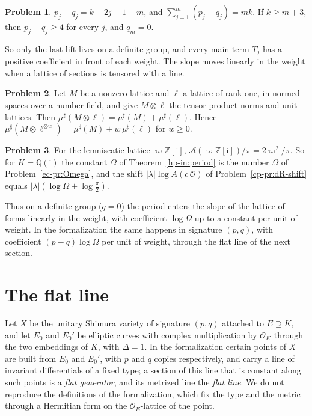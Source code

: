 \documentclass[reqno]{amsart}
\theoremstyle{definition}
\newtheorem{problem}{Problem}[section]
\theoremstyle{plain}
\theoremstyle{remark}
\newcommand{\Z}{\mathbb Z}
\newcommand{\Q}{\mathbb Q}
\newcommand{\Oc}{\mathcal O}
\newcommand{\Ac}{\mathcal A}
\newcommand{\ii}{\mathrm i}
\newcommand{\mus}{\mu^\sharp}
\begin{document}
\begin{problem}\label{pr:signature}
\(p_j - q_j = k + 2j - 1 - m\), and \(\sum_{j=1}^m(p_j - q_j) = mk\).  If \(k \ge m + 3\), then \(p_j - q_j \ge 4\) for every \(j\), and \(q_m = 0\).
\end{problem}

So only the last lift lives on a definite group, and every main term \(T_j\) has a positive coefficient in front of each weight.  The slope moves linearly in the weight when a lattice of sections is tensored with a line.

\begin{problem}\label{pr:tensor-line}
Let \(M\) be a nonzero lattice and \(\ell\) a lattice of rank one, in normed spaces over a number field, and give \(M \otimes \ell\) the tensor product norms and unit lattices.  Then \(\mus(M \otimes \ell) = \mus(M) + \mus(\ell)\).  Hence \(\mus(M \otimes \ell^{\otimes w}) = \mus(M) + w\,\mus(\ell)\) for \(w \ge 0\).
\end{problem}

\begin{problem}\label{pr:definite-shift}
For the lemniscatic lattice \(\varpi\Z[\ii]\), \(\Ac(\varpi\Z[\ii])/\pi = 2\varpi^2/\pi\).  So for \(K = \Q(\ii)\) the constant \(\Omega\) of Theorem~\ref{hp-in:period} is the number \(\Omega\) of Problem~\ref{ec-pr:Omega}, and the shift \(\lvert\lambda\rvert\log A(c\,\Oc)\) of Problem~\ref{cp-pr:dR-shift} equals \(\lvert\lambda\rvert(\log\Omega + \log\frac\pi2)\).
\end{problem}

Thus on a definite group (\(q = 0\)) the period enters the slope of the lattice of forms linearly in the weight, with coefficient \(\log\Omega\) up to a constant per unit of weight.  In the formalization the same happens in signature \((p, q)\), with coefficient \((p-q)\log\Omega\) per unit of weight, through the flat line of the next section.

\section{The flat line}\label{sec:flat}

Let \(X\) be the unitary Shimura variety of signature \((p, q)\) attached to \(E \supseteq K\), and let \(E_0\) and \(E_0'\) be elliptic curves with complex multiplication by \(\Oc_K\) through the two embeddings of \(K\), with \(\Delta = 1\).  In the formalization certain points of \(X\) are built from \(E_0\) and \(E_0'\), with \(p\) and \(q\) copies respectively, and carry a line of invariant differentials of a fixed type; a section of this line that is constant along such points is a \emph{flat generator}, and its metrized line the \emph{flat line}.  We do not reproduce the definitions of the formalization, which fix the type and the metric through a Hermitian form on the \(\Oc_E\)-lattice of the point.
\end{document}
